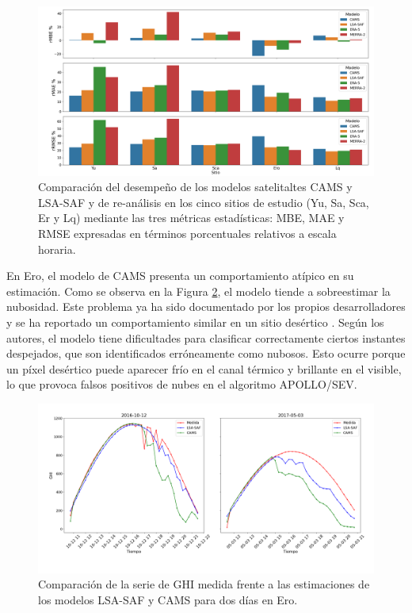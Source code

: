 \begin{figure}
    \centering
    \includegraphics[width=\linewidth]{figuras/errors_60.png}
    \caption{Comparación del desempeño de los modelos satelitaltes CAMS y LSA-SAF y de re-análisis en los cinco sitios de estudio (Yu, Sa, Sca, Er y Lq) mediante las tres métricas estadísticas: MBE, MAE y RMSE expresadas en términos porcentuales relativos a escala horaria.}
    \label{fig:general-60}
\end{figure}


En Ero, el modelo de CAMS presenta un comportamiento atípico en su estimación. Como se observa en la Figura \ref{fig:ero}, el modelo tiende a sobreestimar la nubosidad. Este problema ya ha sido documentado por los propios desarrolladores y se ha reportado un comportamiento similar en un sitio desértico \cite{qu2017}. Según los autores, el modelo tiene dificultades para clasificar correctamente ciertos instantes despejados, que son identificados erróneamente como nubosos. Esto ocurre porque un píxel desértico puede aparecer frío en el canal térmico y brillante en el visible, lo que provoca falsos positivos de nubes en el algoritmo APOLLO/SEV.


\begin{figure}
    \centering
    \includegraphics[width=\linewidth]{figuras/ero.png}
    \caption{Comparación de la serie de GHI medida frente a las estimaciones de los modelos LSA-SAF y CAMS para dos días en Ero.}
    \label{fig:ero}
\end{figure}





